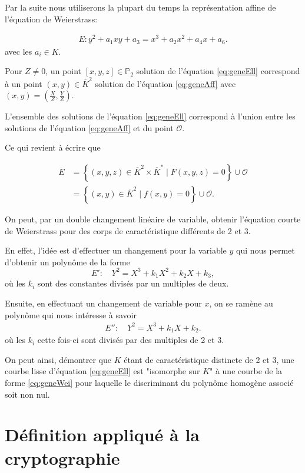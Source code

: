 Par la suite nous utiliserons la plupart du temps la représentation affine de
l'équation de Weierstrass:

\begin{align}
    \label{eq:geneAff}
E : y^2 + a_1xy + a_3 = x^3 +a_2x^2+a_4x+a_6
.\end{align}
avec les $a_{i} \in K$. 

Pour $Z \neq 0$, un point $[x,y,z] \in \mathbb{P}_{2}$ solution de l'équation
\eqref{eq:geneEll} correspond à un point $(x,y) \in \overline{K}^2$ solution de
l'équation \eqref{eq:geneAff} avec $(x,y)=(\frac{X}{Z},\frac{Y}{Z})$.

L'ensemble des solutions de l'équation \eqref{eq:geneEll} correspond à l'union entre les
solutions de l'équation \eqref{eq:geneAff} et du point $\mathcal{O}$.

Ce qui revient à écrire que

\begin{align*}
    E &= \left\{ (x,y,z) \in \overline{K}^2 \times \overline{K}^{*} \mid F(x,y,z) = 0 \right\}  \cup
{\mathcal{O}} \\
&= \left\{ (x,y) \in \overline{K}^2 \mid f(x,y) = 0 \right\} \cup {\mathcal{O}}
.\end{align*}

On peut, par un double changement linéaire de variable, obtenir l'équation courte de Weierstrass
pour des corps de caractéristique différents de 2 et 3.

En effet, l'idée est d'effectuer un changement pour la variable $y$ qui nous permet
d'obtenir un polynôme de la forme
\[
E' :\quad Y^2 = X^3 + k_1X^2 + k_2X + k_3
,\] 
où les $k_{i}$ sont des constantes divisés par un multiples de deux.

Ensuite, en effectuant un changement de variable pour $x$, on se ramène au polynôme qui nous
intéresse à savoir 
\begin{align}
    \label{eq:geneWei}
E'' :\quad Y^2 = X^3 + k_1X + k_2
.\end{align}
où les $k_{i}$ cette fois-ci sont divisés par des multiples de 2 et 3.

On peut ainsi, démontrer que $K$ étant de caractéristique distincte de 2 et 3, une courbe
lisse d'équation \eqref{eq:geneEll} est "isomorphe sur $K$" à une courbe de la forme
\eqref{eq:geneWei} pour laquelle le discriminant du polynôme homogène
associé soit non nul. 

\section{Définition appliqué à la cryptographie}

